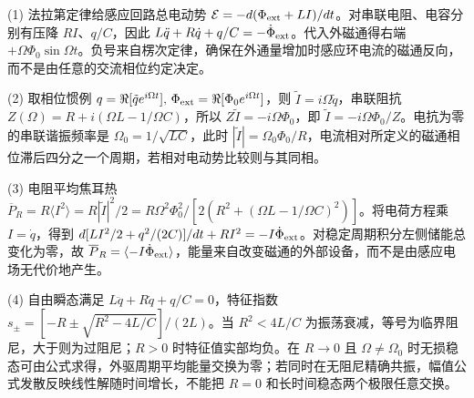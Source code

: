 (1) 法拉第定律给感应回路总电动势 \(\mathcal E=-d(\Phi_{\rm ext}+LI)/dt\)。对串联电阻、电容分别有压降 \(RI\)、\(q/C\)，因此 \(L\ddot q+R\dot q+q/C=-\dot\Phi_{\rm ext}\)。代入外磁通得右端 \(+\Omega\Phi_0\sin\Omega t\)。负号来自楞次定律，确保在外通量增加时感应环电流的磁通反向，而不是由任意的交流相位约定决定。

(2) 取相位惯例 \(q=\Re[\tilde q e^{i\Omega t}],\,\Phi_{\rm ext}=\Re[\Phi_0e^{i\Omega t}]\)，则 \(\tilde I=i\Omega\tilde q\)，串联阻抗 \(Z(\Omega)=R+i(\Omega L-1/\Omega C)\)，所以 \(Z\tilde I=-i\Omega\Phi_0\)，即 \(\tilde I=-i\Omega\Phi_0/Z\)。电抗为零的串联谐振频率是 \(\Omega_0=1/\sqrt{LC}\)，此时 \(|\tilde I|=\Omega_0\Phi_0/R\)，电流相对所定义的磁通相位滞后四分之一个周期，若相对电动势比较则与其同相。

(3) 电阻平均焦耳热 \(\overline P_R=R\langle I^2\rangle=R|\tilde I|^2/2=R\Omega^2\Phi_0^2/[2(R^2+(\Omega L-1/\Omega C)^2)]\)。将电荷方程乘 \(I=\dot q\)，得到 \(d[LI^2/2+q^2/(2C)]/dt+RI^2=-I\dot\Phi_{\rm ext}\)。对稳定周期积分左侧储能总变化为零，故 \(\overline P_R=\langle-I\dot\Phi_{\rm ext}\rangle\)，能量来自改变磁通的外部设备，而不是由感应电场无代价地产生。

(4) 自由瞬态满足 \(L\ddot q+R\dot q+q/C=0\)，特征指数 \(s_\pm=[-R\pm\sqrt{R^2-4L/C}]/(2L)\)。当 \(R^2<4L/C\) 为振荡衰减，等号为临界阻尼，大于则为过阻尼；\(R>0\) 时特征值实部均负。在 \(R\to0\) 且 \(\Omega\ne\Omega_0\) 时无损稳态可由公式求得，外驱周期平均能量交换为零；若同时在无阻尼精确共振，幅值公式发散反映线性解随时间增长，不能把 \(R=0\) 和长时间稳态两个极限任意交换。
